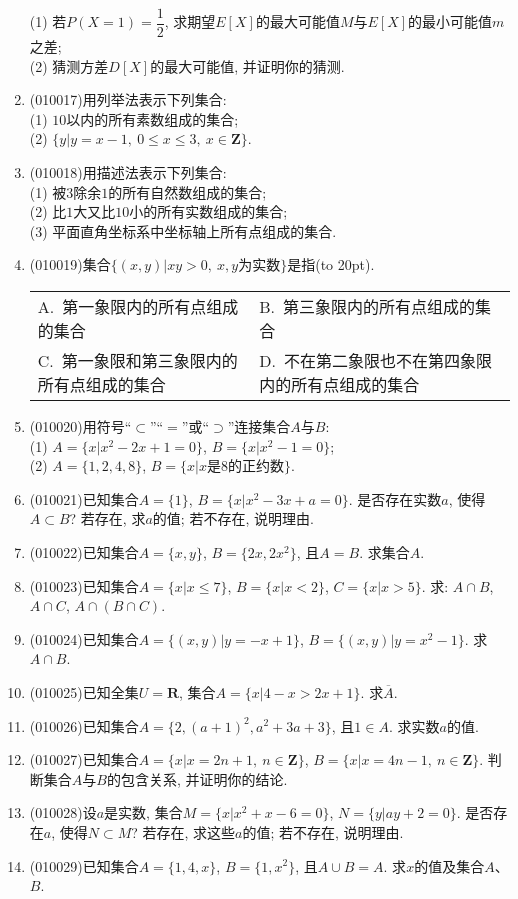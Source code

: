 \documentclass[10pt,a4paper]{article}
\newcommand{\bracket}[1]{(\hbox to #1pt{})}
\newcommand{\twoch}[4]{\par\begin{tabular}{p{.46\textwidth}p{.46\textwidth}}
A.~#1& B.~#2\\
C.~#3& D.~#4
\end{tabular}}
\begin{document}
\begin{enumerate}[1.]
(1) 若$P(X=1)=\dfrac 12$, 求期望$E[X]$的最大可能值$M$与$E[X]$的最小可能值$m$之差;\\
(2) 猜测方差$D[X]$的最大可能值, 并证明你的猜测.
\item {\tiny (010017)}用列举法表示下列集合:\\
(1) $10$以内的所有素数组成的集合;\\
(2) $\{y|y=x-1,\  0\le x\le 3,\ x\in \mathbf{Z}\}$.
\item {\tiny (010018)}用描述法表示下列集合:\\
(1) 被$3$除余$1$的所有自然数组成的集合;\\
(2) 比$1$大又比$10$小的所有实数组成的集合;\\
(3) 平面直角坐标系中坐标轴上所有点组成的集合.
\item {\tiny (010019)}集合$\{(x, y)|xy>0, \ x,y\text{为实数}\}$是指\bracket{20}.
\twoch{第一象限内的所有点组成的集合}{第三象限内的所有点组成的集合}{第一象限和第三象限内的所有点组成的集合}{不在第二象限也不在第四象限内的所有点组成的集合}
\item {\tiny (010020)}用符号``$\subset$''``$=$''或``$\supset$''连接集合$A$与$B$:\\
(1) $A=\{x|x^2-2x+1=0\}$, $B=\{x|x^2-1=0\}$;\\
(2) $A=\{1, 2, 4, 8\}$, $B=\{x|x$是$8$的正约数$\}$.
\item {\tiny (010021)}已知集合$A=\{1\}$, $B=\{x|x^2-3x+a=0\}$. 是否存在实数$a$, 使得$A\subset B$?  若存在, 求$a$的值; 若不存在, 说明理由.
\item {\tiny (010022)}已知集合$A=\{x, y\}$, $B=\{2x, 2x^2\}$, 且$A=B$. 求集合$A$.
\item {\tiny (010023)}已知集合$A=\{x|x\le 7\}$, $B=\{x|x<2\}$, $C=\{x|x>5\}$. 求: $A\cap B$, $A\cap C$, $A\cap (B\cap C)$.
\item {\tiny (010024)}已知集合$A=\{(x, y)|y=-x+1\}$, $B=\{(x, y)|y=x^2-1\}$. 求$A\cap B$.
\item {\tiny (010025)}已知全集$U=\mathbf{R}$, 集合$A=\{x|4-x>2x+1\}$. 求$\overline A$.
\item {\tiny (010026)}已知集合$A=\{2, (a+1)^2, a^2+3a+3\}$, 且$1\in A$. 求实数$a$的值.
\item {\tiny (010027)}已知集合$A=\{x|x=2n+1,\ n\in \mathbf{Z}\}$, $B=\{x|x=4n-1,\ n\in \mathbf{Z}\}$. 判断集合$A$与$B$的包含关系, 并证明你的结论.
\item {\tiny (010028)}设$a$是实数, 集合$M=\{x|x^2+x-6=0\}$, $N=\{y|ay+2=0\}$. 是否存在$a$, 使得$N\subset M$? 若存在, 求这些$a$的值; 若不存在, 说明理由.
\item {\tiny (010029)}已知集合$A=\{1, 4, x\}$, $B=\{1, x^2\}$, 且$A\cup B=A$. 求$x$的值及集合$A$、$B$.

\end{enumerate}
\end{document}
